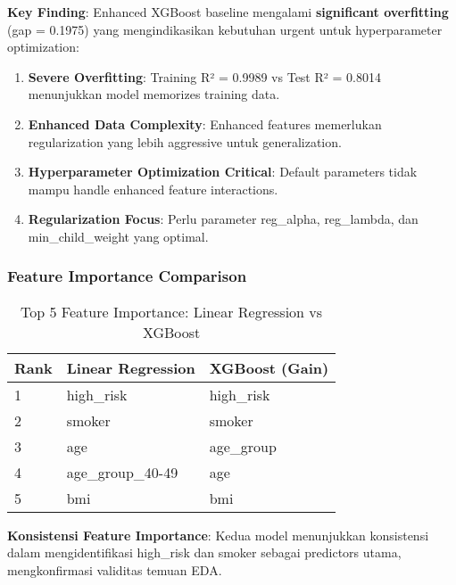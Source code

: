 \textbf{Key Finding}: Enhanced XGBoost baseline mengalami \textbf{significant overfitting} (gap = 0.1975) yang mengindikasikan kebutuhan urgent untuk hyperparameter optimization:

\begin{enumerate}
    \item \textbf{Severe Overfitting}: Training R² = 0.9989 vs Test R² = 0.8014 menunjukkan model memorizes training data.

    \item \textbf{Enhanced Data Complexity}: Enhanced features memerlukan regularization yang lebih aggressive untuk generalization.

    \item \textbf{Hyperparameter Optimization Critical}: Default parameters tidak mampu handle enhanced feature interactions.

    \item \textbf{Regularization Focus}: Perlu parameter reg\_alpha, reg\_lambda, dan min\_child\_weight yang optimal.
\end{enumerate}

\subsubsection{Feature Importance Comparison}
\begin{table}[H]
\centering
\caption{Top 5 Feature Importance: Linear Regression vs XGBoost}
\label{tab:feature-importance-comparison}
\begin{tabular}{|l|l|l|}
\hline
\textbf{Rank} & \textbf{Linear Regression} & \textbf{XGBoost (Gain)} \\
\hline
1 & high\_risk & high\_risk \\
2 & smoker & smoker \\
3 & age & age\_group \\
4 & age\_group\_40-49 & age \\
5 & bmi & bmi \\
\hline
\end{tabular}
\end{table}

\textbf{Konsistensi Feature Importance}: Kedua model menunjukkan konsistensi dalam mengidentifikasi high\_risk dan smoker sebagai predictors utama, mengkonfirmasi validitas temuan EDA.

